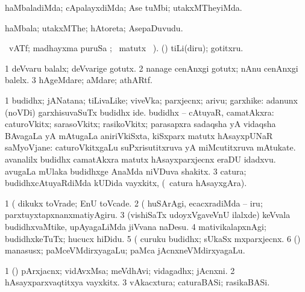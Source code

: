 \bentry
{} 
\gl{\kirxvi}
\expl{}
\bmng
haMbaladiMda; cApalayxdiMda; Ase tuMbi; utakxMTheyiMda. 
\emng
\eentry

\bentry
{} 
\gl{\nA}
\expl{}
\bmng
haMbala; utakxMThe; hAtoreta; AsepaDuvudu. 
\emng
\eentry

\bentry
{} 
\gl{\kirx}
  \ucAcx\ vATf; madhayxma puruSa ; \BU\ matutx \BUkaq\ ).\bmng
(\pArxparx) tiLi(diru); gotitxru. 
\emng

\noindent
\gl{\pagu}
\expl{}
\bmng
\bnum
\num{1}  deVvaru balalx; deVvarige gotutx. 
\num{2}  nanage cenAnxgi gotutx; nAnu cenAnxgi balelx. 
\num{3}  hAgeMdare; aMdare; athARtf. 
\enum
\emng
\eentry

\bentry
{} 
\gl{\nA}
\expl{}
\bmng
\bnum
\num{1} budidhx; jANatana; tiLivaLike; viveVka; parxjecnx; arivu; garxhike:  adanunx (noVDi) garxhisuvaSuTx budidhx ide. 
 budidhx -- cAtuyaR, camatAkxra: 
\banum
{} caturoVkitx; sarasoVkitx; rasikoVkitx; parasapxra sadaqsha yA vidaqsha BAvagaLa yA mAtugaLa aniriVkiSxta, kiSxparx matutx hAsayxpUNaR saMyoVjane:  caturoVkitxgaLu suPxrisutitxruva yA miMcutitxruva mAtukate.  avanalilx budidhx camatAkxra matutx hAsayxparxjecnx eraDU idadxvu. 
 avugaLa mUlaka budidhxge AnaMda niVDuva shakitx. 
\eanum
\numie
\num{3} catura; budidhxcAtuyaRdiMda kUDida vayxkitx, (\kanmu\ catura hAsayxgAra). 
\enum
\emng

\noindent
\gl{\pagu}
\expl{}
\bmng
\bnum
\num{1}  (  dikukx toVrade; EnU toVcade. 
\num{2}  (  huSArAgi, ecacxradiMda -- iru; parxtuyxtapxnanxmatiyAgiru. 
\num{3}  (vishiSaTx udoyxVgaveVnU ilalxde) keVvala budidhxvaMtike, upAyagaLiMda jiVvana naDesu. 
\num{4}  mativikalapxnAgi; budidhxkeTuTx; hucucx hiDidu. 
\num{5}  (  curuku budidhx; sUkaSx mxparxjecnx. 
\num{6}  (\pArxparx) manasusx; paMceVMdirxyagaLu; paMca jAcnxneVMdirxyagaLu. 
\enum
\emng
\eentry

\bentry
{} 
\gl{\nA}
\expl{}
\bmng
\bnum
\num{1} (\pArxparx) pArxjacnx; vidAvxMsa; meVdhAvi; vidagadhx; jAcnxni. 
\num{2} hAsayxparxvaqtitxya vayxkitx. 
\num{3} vAkacxtura; caturaBASi; rasikaBASi. 
\enum
\emng
\eentry

